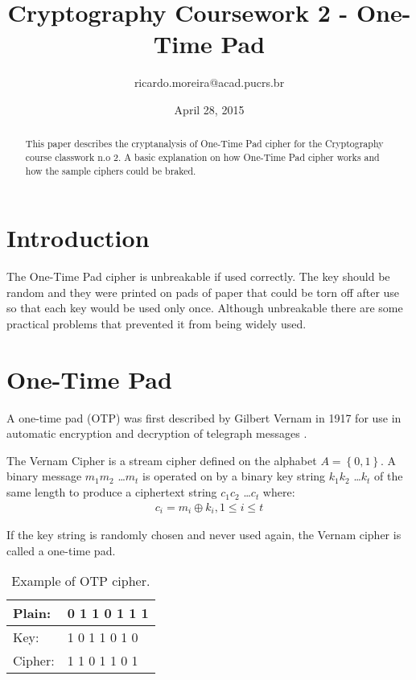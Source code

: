 \documentclass{article}
\title{Cryptography Coursework 2 - One-Time Pad}
\author{ricardo.moreira@acad.pucrs.br }
\date{April 28, 2015}
\newcommand*\xor{\mathbin{\oplus}}
\begin{document}
\maketitle

\begin{abstract}
This paper describes the cryptanalysis of One-Time Pad cipher for the Cryptography course classwork n.o 2. A basic explanation on how One-Time Pad cipher works and how the sample ciphers could be braked.
\end{abstract}

\section{Introduction}

The One-Time Pad cipher is unbreakable if used correctly. The key should be random and they were printed on pads of paper that could be torn off after use so that each key would be used only once. Although unbreakable there are some practical problems that prevented it from being widely used.

\section{One-Time Pad}

A one-time pad (OTP) was first described by Gilbert Vernam in 1917 for use in automatic encryption and decryption of telegraph messages \cite{menezes:1996}.

The Vernam Cipher is a stream cipher defined on the alphabet $ A = \left\{0, 1\right\}$. A binary message $m_1m_2$ \dots $m_t$ is operated on by a binary key string $k_1k_2$ \dots $k_t$ of the same length to produce a ciphertext string $c_1c_2$ \dots $c_t$ where:
\begin{eqnarray}
c_i = m_i \xor k_i , 1 \leq i \leq t
\end{eqnarray}

If the key string is randomly chosen and never used again, the Vernam cipher is called a one-time pad.

\begin{table}[!htb]
 \centering
  \begin{tabular}{ l | l }
    \hline
    Plain:  & 0 1 1 0 1 1 1 \\ \hline
    Key:    & 1 0 1 1 0 1 0 \\ \hline
    Cipher: & 1 1 0 1 1 0 1 \\ \hline
  \end{tabular}
 \caption{Example of OTP cipher.}\label{tab:otp1}
\end{table}
\end{document}
